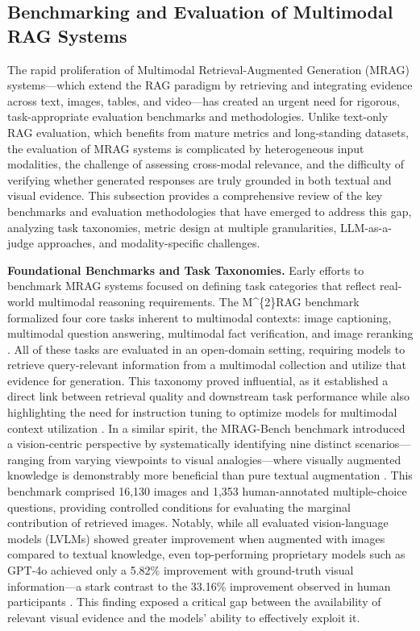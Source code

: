 \documentclass[11pt]{article}
\begin{document}
\subsection{Benchmarking and Evaluation of Multimodal RAG Systems}

The rapid proliferation of Multimodal Retrieval-Augmented Generation (MRAG) systems---which extend the RAG paradigm by retrieving and integrating evidence across text, images, tables, and video---has created an urgent need for rigorous, task-appropriate evaluation benchmarks and methodologies. Unlike text-only RAG evaluation, which benefits from mature metrics and long-standing datasets, the evaluation of MRAG systems is complicated by heterogeneous input modalities, the challenge of assessing cross-modal relevance, and the difficulty of verifying whether generated responses are truly grounded in both textual and visual evidence. This subsection provides a comprehensive review of the key benchmarks and evaluation methodologies that have emerged to address this gap, analyzing task taxonomies, metric design at multiple granularities, LLM-as-a-judge approaches, and modality-specific challenges.

\textbf{Foundational Benchmarks and Task Taxonomies.} Early efforts to benchmark MRAG systems focused on defining task categories that reflect real-world multimodal reasoning requirements. The M\^{}\{2\}RAG benchmark formalized four core tasks inherent to multimodal contexts: image captioning, multimodal question answering, multimodal fact verification, and image reranking \cite{ref356}. All of these tasks are evaluated in an open-domain setting, requiring models to retrieve query-relevant information from a multimodal collection and utilize that evidence for generation. This taxonomy proved influential, as it established a direct link between retrieval quality and downstream task performance while also highlighting the need for instruction tuning to optimize models for multimodal context utilization \cite{ref356}. In a similar spirit, the MRAG-Bench benchmark introduced a vision-centric perspective by systematically identifying nine distinct scenarios---ranging from varying viewpoints to visual analogies---where visually augmented knowledge is demonstrably more beneficial than pure textual augmentation \cite{ref357}. This benchmark comprised 16,130 images and 1,353 human-annotated multiple-choice questions, providing controlled conditions for evaluating the marginal contribution of retrieved images. Notably, while all evaluated vision-language models (LVLMs) showed greater improvement when augmented with images compared to textual knowledge, even top-performing proprietary models such as GPT-4o achieved only a 5.82\% improvement with ground-truth visual information---a stark contrast to the 33.16\% improvement observed in human participants \cite{ref357}. This finding exposed a critical gap between the availability of relevant visual evidence and the models' ability to effectively exploit it.
\end{document}

